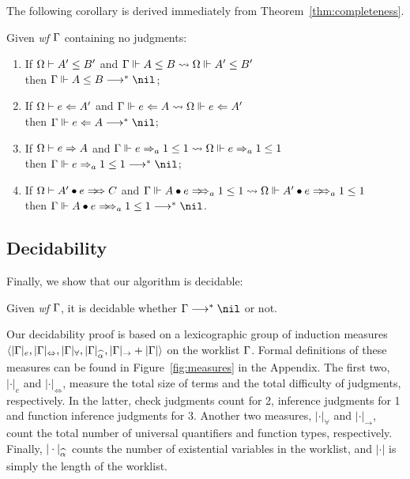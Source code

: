 The following corollary is derived immediately from Theorem~\ref{thm:completeness}.
\begin{corollary}
Given \emph{wf }$\Gamma$ containing no judgments:
\begin{enumerate}
    \item If $\Omega \vdash A' \le B'$ and $\Gamma \Vdash A \le B \rightsquigarrow \Omega \Vdash A' \le B'$
        \\then $\Gm \Vdash A \le B \redto \nil$;
    \item If $\Omega \vdash e \Leftarrow A'$ and $\Gamma \Vdash e \Leftarrow A \rightsquigarrow \Omega \Vdash e \Leftarrow A'$
        \\then $\Gm \Vdash e \Lto A \redto \nil$;
    \item If $\Omega \vdash e \Rightarrow A$ and $\Gamma \Vdash e \Rightarrow_a 1 \le 1 \rightsquigarrow \Omega \Vdash e \Rightarrow_a 1 \le 1$
        \\then $\Gm \Vdash e \To_a 1 \le 1 \redto \nil$;
    \item If $\Om \vdash \appInf{A'}{e}{C}$ and
        $\Gm \Vdash \appInfAlg{A}{e}[a][1 \le 1] \sto \Om \Vdash \appInfAlg{A'}{e}[a][1 \le 1]$
        \\then $\Gm \Vdash \appInfAlg{A}{e}[a][1 \le 1] \redto \nil$.
\end{enumerate}
\end{corollary}

\subsection{Decidability}

Finally, we show that our algorithm is decidable:
\begin{theorem}[Decidability]
Given \emph{wf} $\Gamma$, it is decidable whether $\Gm\redto\nil$ or not.
\end{theorem}
Our decidability proof is based on a lexicographic group of induction measures\\
$\langle |\Gm|_e, |\Gm|_\Leftrightarrow, |\Gm|_\forall, |\Gm|_{\al}, |\Gm|_\to + |\Gm| \rangle$
on the worklist $\Gamma$. Formal definitions of these measures can be found in
Figure~\ref{fig:measures} in the Appendix. The first two, 
$|\cdot|_e$ and $|\cdot|_\Leftrightarrow$, measure the total size of terms
and the total difficulty of judgments, respectively. In the latter, check judgments
count for 2, inference judgments for 1 and function inference judgments for 3.
Another two measures, $|\cdot|_\forall$ and $|\cdot|_\to$, count the total number of
universal quantifiers and function types, respectively. Finally,
$|\cdot|_{\al}$ counts the number of existential variables in the worklist,
and $|\cdot|$ is simply the length of the worklist.

